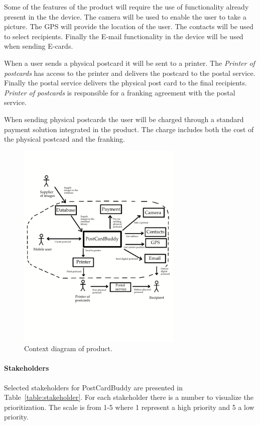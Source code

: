 \documentclass[10pt,a4paper]{article}
\begin{document}
Some of the features of the product will require the use of functionality already present in the the device. The camera will be used to enable the user to take a picture. The GPS will provide the location of the user. The contacts will be used to select recipients. Finally the E-mail functionality in the device will be used when sending E-cards.
 
When a user sends a physical postcard it will be sent to a printer. The  \textit{Printer of postcards} has access to the printer and delivers the postcard to the postal service.  Finally the postal service delivers the physical post card to the final recipients. \textit{Printer of postcards} is responsible for a franking agreement with the postal service.

When sending physical postcards the user will be charged through a standard payment solution integrated in the product. The charge includes both the cost of the physical postcard and the franking. 

\begin{figure}[h!]
\centering
\includegraphics[width=0.7\textwidth]{ContextDiagram4.pdf}
\caption{Context diagram of product.}
\label{fig:context}
\end{figure}
\FloatBarrier

\paragraph{Stakeholders}
Selected stakeholders for PostCardBuddy are presented in Table~\ref{table:stakeholder}. For each stakeholder there is a number to visualize the prioritization. The scale is from 1-5 where 1 represent a high priority and 5 a low priority.
\end{document}
